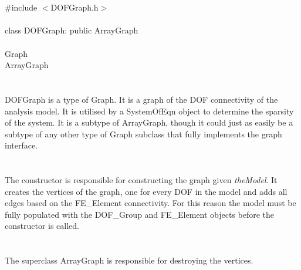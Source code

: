 
 \\

   \\
\indent \#include $<$DOFGraph.h$>$  \\

  \\
\indent class DOFGraph: public ArrayGraph \\

 \\
\indent Graph \\
\indent\indent ArrayGraph \\
\indent\indent{} \\

  \\
\indent DOFGraph is a type of Graph. It is a graph of the DOF
connectivity of the analysis model. It is utilised by a SystemOfEqn
object to determine the sparsity of the system. It is a subtype of
ArrayGraph, though it could just as easily be a subtype of any other
type of Graph subclass that fully implements the graph interface. \\ 

  \\
  \\
The constructor is responsible for constructing the graph given {\em
theModel}. It creates the vertices of the graph, one for every
DOF in the model and adds all edges based on the FE\_Element
connectivity. For this reason the model must be fully populated with
the DOF\_Group and FE\_Element objects before the constructor is
called. \\

  \\
  \\
The superclass ArrayGraph is responsible for destroying the vertices. \\

  \\

  \\
